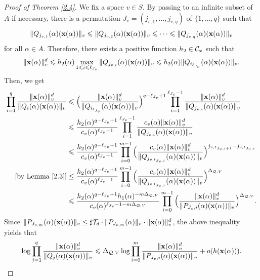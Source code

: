 \documentclass[12pt,leqno]{amsart}
\numberwithin{equation}{section}
\begin{document}
\begin{proof}[Proof of Theorem \ref{2.4}]
We fix a space $v\in S$. By passing to an infinite subset of $A$ if necessary, there is a permutation ${J_v}=(j_{v,1},\ldots,j_{v,q})$ of $\{1,\dots,q\}$ such that
$$\|Q_{j_{v,1}}(\alpha)({\bf x}(\alpha))\|_v\leqslant   \|Q_{j_{v,2}}(\alpha)({\bf x}(\alpha))\|_v\leqslant \dots\leqslant \|Q_{j_{v,q}}(\alpha)({\bf x}(\alpha))\|_v$$
for all $\alpha\in A$. Therefore, there exists a positive function $h_2\in \mathcal C_{\bf x}$ such that
$$\|{\bf x}(\alpha)\|_{v}^{d}\leqslant h_2(\alpha)\max_{1\leqslant i\leqslant \ell_{{J_v}}}\|Q_{j_{v,i}}(\alpha)({\bf x}(\alpha))\|_v
\leqslant h_2(\alpha) \|Q_{i_{\ell_{{J_v}}}}(\alpha)({\bf x}(\alpha))\|_v.$$
Then, we get
\begin{align*}
\prod_{i=1}^{q}\dfrac{\|{\bf x}(\alpha)\|_{v}^{d}}{\|Q_{i}(\alpha)({\bf x}(\alpha))\|_v}&\leqslant \Big(\dfrac{\|{\bf x}(\alpha)\|_v^d}{\|Q_{i_{\ell_{{J_v}}}}(\alpha)({\bf x}(\alpha))\|_v}\Big)^{q-\ell_{{J_v}}+1}\prod_{i=1}^{\ell_{{J_v}}-1}\dfrac{\|{\bf x}(\alpha)\|_v^d}{\|Q_{j_{v,i}}(\alpha)({\bf x}(\alpha))\|_v}\\
&\leqslant \dfrac{h_2(\alpha)^{q-\ell_{{J_v}}+1}}{c_v(\alpha)^{\ell_{{J_v}}-1}}\prod_{i=1}^{\ell_{{J_v}}-1}\dfrac{c_v(\alpha)\|{\bf x}(\alpha)\|_{v}^{d}}{\|Q_{j_{v,i}}(\alpha)({\bf x}(\alpha))\|_v}\\
&\leqslant \dfrac{{h_2}(\alpha)^{q-\ell_{{J_v}}+1}}{c_v(\alpha)^{\ell_{{J_v}}-1}}\prod_{i=0}^{m-1}
\Big(\dfrac{c_v(\alpha)\|{\bf x}(\alpha)\|_{v}^{d}}{\|Q_{j_{v,t_{{J_v},i}}}(\alpha)({\bf x}(\alpha))\|_v}\Big)^{j_{v,t_{{J_v},i+1}}-j_{v,t_{{J_v},i}}}\\
\text{[by Lemma \ref{2.3}]}&\le\dfrac{h_2(\alpha)^{q-\ell_{{J_v}}+1}}{c_v(\alpha)^{\ell_{{J_v}}-1}}\prod_{i=0}^{m-1}
\Big(\dfrac{c_v(\alpha)\|{\bf x}(\alpha)\|_{v}^{d}}{\|Q_{j_{v,t_{{J_v},i}}}(\alpha)({\bf x}(\alpha))\|_v}\Big)^{\Delta_{\mathcal Q,V}}\\
&\leqslant \dfrac{h_2(\alpha)^{q-\ell_{{J_v}}+1}h_1(\alpha)^{-m\Delta_{\mathcal Q,V}}}{c_v(\alpha)^{\ell_{{J_v}}-1-m\Delta_{\mathcal Q,V}}}\prod_{i=0}^{m-1}\Big(\dfrac{\|{\bf x}(\alpha)\|_{v}^{d}}{\|P_{J_v,i}(\alpha)({\bf x}(\alpha))\|_v}\Big)^{\Delta_{\mathcal Q,V}}.
\end{align*}
Since $\|P_{J_{v,m}}(\alpha)({\bf x}(\alpha))\|_v\le\sharp\mathcal T_d\cdot\|P_{J_{v,m}}(\alpha)\|_v\cdot\|{\bf x}(\alpha)\|^d_v$, 
the above inequality yields that
\begin{align}\label{2.5}
\log \prod_{j=1}^{q}\dfrac{\|{\bf x}(\alpha)\|_v^{d}}{\|Q_j(\alpha)({\bf x}(\alpha))\|_v}\leqslant \Delta_{\mathcal Q,V}\log \prod_{i=0}^{m}\dfrac{\|{\bf x}(\alpha)\|_v^{d}}{\|P_{J_v,i}(\alpha)({\bf x}(\alpha))\|_v}+o(h({\bf x}(\alpha))).
\end{align}


\end{proof}
\end{document}
